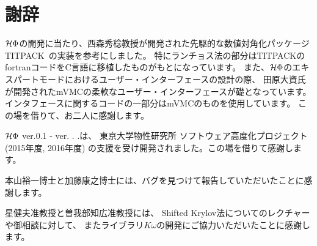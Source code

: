 \chapter{謝辞}
\label{Ch:ack}
$\mathcal{H} \Phi$の開発に当たり、西森秀稔教授が開発された先駆的な数値対角化パッケージTITPACK~\cite{titpack}の実装を参考にしました。
特にランチョス法の部分はTITPACKのfortranコードをC言語に移植したものがもとになっています。
また、$\mathcal{H} \Phi$のエキスパートモードにおけるユーザー・インターフェースの設計の際、
田原大資氏が開発されたmVMCの柔軟なユーザー・インターフェースが礎となっています。
インタフェースに関するコードの一部分はmVMCのものを使用しています。
この場を借りて、お二人に感謝します。

$\mathcal{H} \Phi$ ver.0.1 - ver. \hspace{-0.2cm}
    \hspace{-0.2cm}.
    \hspace{-0.2cm}.は、
東京大学物性研究所 ソフトウェア高度化プロジェクト(2015年度, 2016年度)
の支援を受け開発されました。この場を借りて感謝します。

本山裕一博士と加藤康之博士には、バグを見つけて報告していただいたことに感謝します。

星健夫准教授と曽我部知広准教授には、
Shifted Krylov法についてのレクチャーや御相談に対して、
またライブラリ$K\omega$の開発にご協力いただいたことに感謝します。
